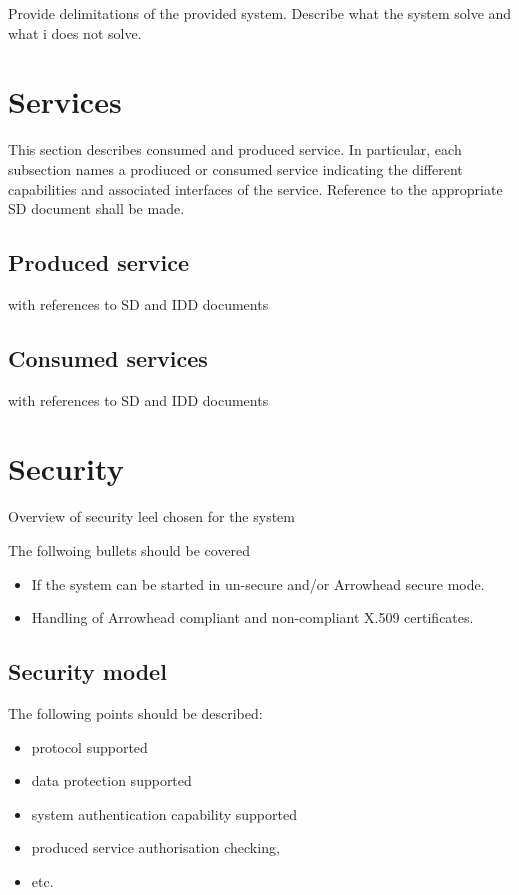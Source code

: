 \documentclass[a4paper]{arrowhead}
\begin{document}
\color{red}
Provide delimitations of the provided system. Describe what the system
solve and what i does not solve.
\color{black}  



\newpage

\section{Services}
\label{sec:services}

\color{red}
This section describes consumed and produced service.
In particular, each subsection names a prodiuced or consumed service
indicating the different capabilities and associated interfaces of the
service. Reference to the appropriate SD document shall be made.

\subsection{Produced service}
with references to SD and IDD documents

\subsection{Consumed services}
with references to SD and IDD documents

\color{black}




\newpage

\section{Security}
\label{sec:security}


\color{red}
Overview of security leel chosen for the system

The follwoing bullets should be covered 
\begin{itemize}
\item  If the system can be started in un-secure and/or
Arrowhead secure mode.
\item Handling of Arrowhead compliant and
non-compliant X.509 certificates.
\end{itemize}

\subsection {Security model}
The following points should be described:
\begin{itemize}
\item protocol supported 
\item data protection supported 
\item system authentication capability supported
\item produced service authorisation checking, 
\item etc.
\end{itemize}
\end{document}
